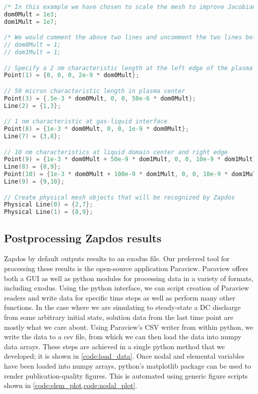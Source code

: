 \begin{lstlisting}[language=C++, caption=Gmsh input file used to create plasma and liquid domains for simulations in \cref{sec:plasliq}, label=code:gmsh]
/* In this example we have chosen to scale the mesh to improve Jacobian conditioning */
dom0Mult = 1e3;
dom1Mult = 1e7;

/* We would comment the above two lines and uncomment the two lines below if we did not want to scale the mesh */
// dom0Mult = 1;
// dom1Mult = 1;

// Specify a 2 nm characteristic length at the left edge of the plasma
Point(1) = {0, 0, 0, 2e-9 * dom0Mult};

// 50 micron characteristic length in plasma center
Point(3) = {.5e-3 * dom0Mult, 0, 0, 50e-6 * dom0Mult};
Line(2) = {1,3};

// 1 nm characteristic at gas-liquid interface
Point(8) = {1e-3 * dom0Mult, 0, 0, 1e-9 * dom0Mult};
Line(7) = {3,8};

// 10 nm characteristics at liquid domain center and right edge
Point(9) = {1e-3 * dom0Mult + 50e-9 * dom1Mult, 0, 0, 10e-9 * dom1Mult};
Line(8) = {8,9};
Point(10) = {1e-3 * dom0Mult + 100e-9 * dom1Mult, 0, 0, 10e-9 * dom1Mult};
Line(9) = {9,10};

// Create physical mesh objects that will be recognized by Zapdos
Physical Line(0) = {2,7};
Physical Line(1) = {8,9};
\end{lstlisting}

\subsection{Postprocessing Zapdos results}
\label{sec:zap_post}

Zapdos by default outputs results to an exodus file. Our preferred tool for processing these results is the open-source application Paraview. \cite{paraview} Paraview offers both a GUI as well as python modules for processing data in a variety of formats, including exodus. Using the python interface, we can script creation of Paraview readers and write data for specific time steps as well as perform many other functions. In the case where we are simulating to steady-state a DC discharge from some arbitrary initial state, solution data from the last time point are mostly what we care about. Using Paraview's CSV writer from within python, we write the data to a csv file, from which we can then load the data into numpy data arrays. These steps are achieved in a single python method that we developed; it is shown in \cref{code:load_data}. Once nodal and elemental variables have been loaded into numpy arrays, python's matplotlib package can be used to render publication-quality figures. This is automated using generic figure scripts shown in \cref{code:elem_plot,code:nodal_plot}.


